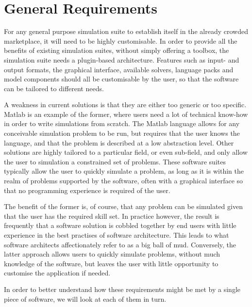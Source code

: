 \documentclass[\rootfolder/main.tex]{subfiles}
\begin{document}
\section{General Requirements}

For any general purpose simulation suite to establish itself in the already crowded marketplace, it will need to be highly customisable.
In order to provide all the benefits of existing simulation suites, without simply offering a toolbox, the simulation suite needs a plugin-based architecture.
Features such as input- and output formats, the graphical interface, available solvers, language packs and model components should all be customisable by the user,
so that the software can be tailored to different needs.

A weakness in current solutions is that they are either too generic or too specific.
Matlab is an example of the former, where users need a lot of technical know-how in order to write simulations from scratch.
The Matlab language allows for any conceivable simulation problem to be run, but requires that the user knows the language,
and that the problem is described at a low abstraction level.
Other solutions are highly tailored to a particular field, or even sub-field, and only allow the user to simulation a constrained set of problems.
These software suites typically allow the user to quickly simulate a problem, as long as it is within the realm of problems supported by the software,
often with a graphical interface so that no programming experience is required of the user.

The benefit of the former is, of course, that any problem can be simulated given that the user has the required skill set.
In practice however, the result is frequently that a software solution is cobbled together by end users with little experience in the best practises of software architecture.
This leads to what software architects affectionately refer to as a big ball of mud.
Conversely, the latter approach allows users to quickly simulate problems, without much knowledge of the software, but leaves the user with little opportunity to customise the application if needed.

In order to better understand how these requirements might be met by a single piece of software, we will look at each of them in turn.
\end{document}
